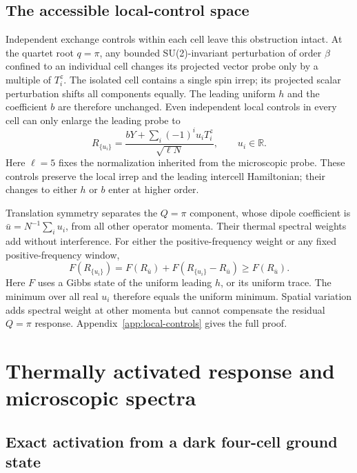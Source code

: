 \subsection{The accessible local-control space}

Independent exchange controls within each cell leave this obstruction
intact. At the quartet root $q=\pi$, any bounded
SU(2)-invariant perturbation of order $\beta$ confined to an individual
cell changes its projected vector probe only by a multiple of $T_i^z$.
The isolated cell contains a single spin irrep; its projected scalar
perturbation shifts all components equally. The leading uniform $h$ and
the coefficient $b$ are therefore unchanged. Even independent local
controls in every cell can only enlarge the leading probe to
\begin{equation}
 R_{\{u_i\}}=\frac{bY+\sum_i(-1)^iu_iT_i^z}{\sqrt{\ell N}},
 \qquad u_i\in\mathbb R.
 \label{eq:local-control-probe}
\end{equation}
Here $\ell=5$ fixes the normalization inherited from the microscopic probe.
These controls preserve the local irrep and the leading intercell
Hamiltonian; their changes to either $h$ or $b$ enter at higher order.

Translation symmetry separates the $Q=\pi$ component, whose dipole
coefficient is $\bar u=N^{-1}\sum_i u_i$, from all other operator momenta.
Their thermal spectral weights add without interference. For either the
positive-frequency weight or any fixed positive-frequency window,
\begin{equation}
 F(R_{\{u_i\}})=F(R_{\bar u})+
 F(R_{\{u_i\}}-R_{\bar u})\ge F(R_{\bar u}).
 \label{eq:local-control-projection}
\end{equation}
Here $F$ uses a Gibbs state of the uniform leading $h$, or its uniform
trace. The minimum over all real $u_i$ therefore equals the uniform
minimum. Spatial variation adds spectral weight at other momenta but
cannot compensate the residual $Q=\pi$ response.
Appendix~\ref{app:local-controls} gives the full proof.

\section{Thermally activated response and microscopic spectra}

\subsection{Exact activation from a dark four-cell ground state}

